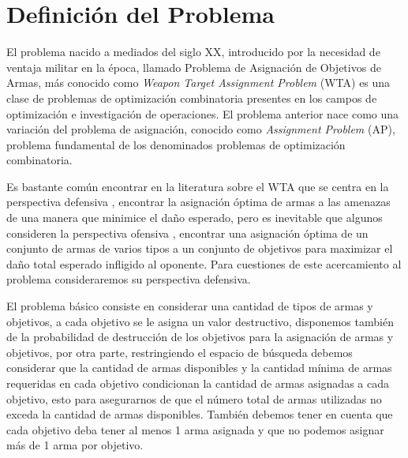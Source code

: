\section{Definición del Problema}

El problema nacido a mediados del siglo XX, introducido por la necesidad de ventaja militar en la época, llamado Problema de Asignación  de Objetivos de Armas, más conocido como \textit{Weapon Target Assignment Problem} (WTA) es una clase de problemas de optimización combinatoria presentes en los campos de optimización e investigación de operaciones.
El problema anterior nace como una variación del problema de asignación, conocido como \textit{Assignment Problem} (AP), problema fundamental de los denominados problemas de optimización combinatoria.


Es bastante común encontrar en la literatura sobre el WTA que se centra en la perspectiva defensiva \cite{ahuja-2007}    \cite{Introduccion} \cite{WithTechniques}, encontrar la asignación óptima de armas a las amenazas de una manera que minimice el daño esperado, pero es inevitable que algunos consideren la perspectiva ofensiva \cite{Background}, encontrar una asignación óptima de un conjunto de armas de varios tipos a un conjunto de objetivos para maximizar el daño total esperado infligido al oponente.
Para cuestiones de este acercamiento al problema consideraremos su perspectiva defensiva.

El problema básico consiste en considerar una cantidad de tipos de armas y objetivos, a cada objetivo se le asigna un valor destructivo, disponemos también de la probabilidad de destrucción de los objetivos para la asignación de armas y objetivos, por otra parte, restringiendo el espacio de búsqueda debemos considerar que la cantidad de armas disponibles y la cantidad mínima de armas requeridas en cada objetivo condicionan la cantidad de armas asignadas a cada objetivo, esto para asegurarnos de que  el número total de armas utilizadas no exceda la cantidad de armas disponibles. 
También debemos tener en cuenta que cada objetivo deba tener al menos 1 arma asignada y que no podemos asignar más de 1 arma por objetivo.


